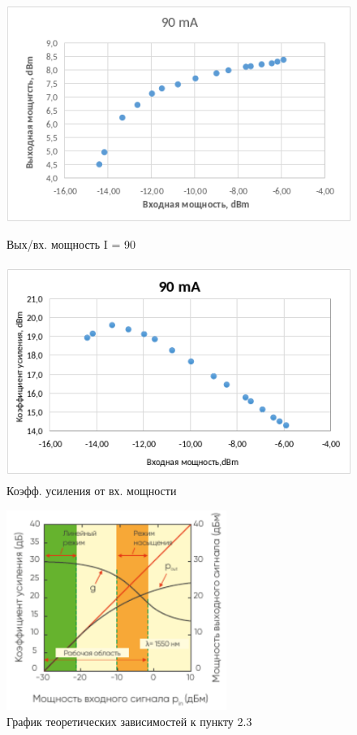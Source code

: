 \documentclass[12pt,a4paper]{article}
\begin{document}
\begin{figure}[h!]
    \begin{center}
    \begin{minipage}[h!]{0.49\linewidth}
    \includegraphics[width = 1\textwidth, height=7cm]{point_4_90.png}
    \caption{Вых/вх. мощность I = 90}
    \label{1}
    \end{minipage}
    \begin{minipage}[h!]{0.49\linewidth}
    \includegraphics[width = 1\textwidth, height=7cm]{point_5_90.png}
    \caption{Коэфф. усиления от вх. мощности}
    \label{2}
    \end{minipage}
    \end{center}
\end{figure}  

\begin{figure}[h!]
		\centering
		\includegraphics[width=0.5\linewidth, height=6.5cm]{point5_th.png}
		\caption{График теоретических зависимостей к пункту 2.3}
		\label{labC}
\end{figure}
\end{document}
